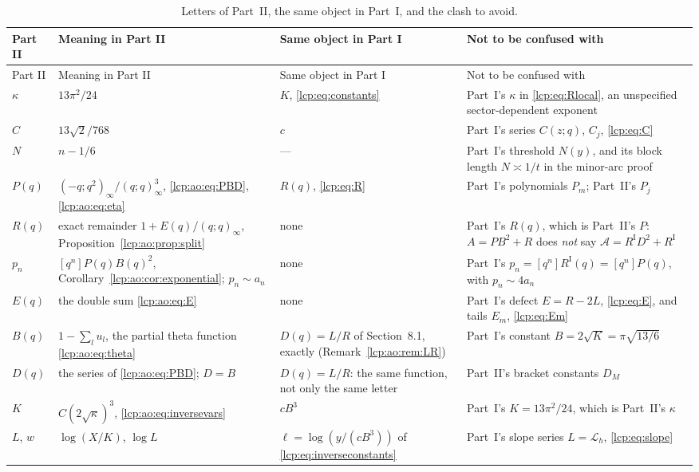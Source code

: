 \documentclass[11pt]{article}
\numberwithin{equation}{section}
\theoremstyle{definition}\newtheorem{definition}[theorem]{Definition}
\theoremstyle{remark}\newtheorem{remark}[theorem]{Remark}
\newcommand{\Acal}{\mathcal A}
\newcommand{\Lcal}{\mathcal L}
\begin{document}
{\small
\begin{longtable}{@{}>{\raggedright}p{}>{\raggedright}p{}>{\raggedright}p{}>{\raggedright\arraybackslash}p{}@{}}
\caption{Letters of Part~II, the same object in Part~I, and the clash to avoid.}\label{lcp:ao:tab:notation}\\
\toprule
Part II & Meaning in Part II & Same object in Part I & Not to be confused with\\
\midrule
\endfirsthead
\toprule
Part II & Meaning in Part II & Same object in Part I & Not to be confused with\\
\midrule
\endhead
\bottomrule
\endfoot
$\kappa$ & $13\pi^2/24$ & $K$, \eqref{lcp:eq:constants} & Part~I's $\kappa$ in \eqref{lcp:eq:Rlocal}, an unspecified sector-dependent exponent\\
$C$ & $13\sqrt2/768$ & $c$ & Part~I's series $C(z;q)$, $C_j$, \eqref{lcp:eq:C}\\
$N$ & $n-1/6$ & --- & Part~I's threshold $N(y)$, and its block length $N\asymp1/t$ in the minor-arc proof\\
$P(q)$ & $(-q;q^2)_\infty/(q;q)_\infty^3$, \eqref{lcp:ao:eq:PBD}, \eqref{lcp:ao:eq:eta} & $R(q)$, \eqref{lcp:eq:R} & Part~I's polynomials $P_m$; Part~II's $P_j$\\
$R(q)$ & exact remainder $1+E(q)/(q;q)_\infty$, Proposition~\ref{lcp:ao:prop:split} & none & Part~I's $R(q)$, which is Part~II's $P$: $A=PB^2+R$ does \emph{not} say $\Acal=R^{\mathrm I}D^2+R^{\mathrm I}$\\
$p_n$ & $[q^n]P(q)B(q)^2$, Corollary~\ref{lcp:ao:cor:exponential}; $p_n\sim a_n$ & none & Part~I's $p_n=[q^n]R^{\mathrm I}(q)=[q^n]P(q)$, with $p_n\sim4a_n$\\
$E(q)$ & the double sum \eqref{lcp:ao:eq:E} & none & Part~I's defect $E=R-2L$, \eqref{lcp:eq:E}, and tails $E_m$, \eqref{lcp:eq:Em}\\
$B(q)$ & $1-\sum_lu_l$, the partial theta function \eqref{lcp:ao:eq:theta} & $D(q)=L/R$ of Section~8.1, exactly (Remark~\ref{lcp:ao:rem:LR}) & Part~I's constant $B=2\sqrt K=\pi\sqrt{13/6}$\\
$D(q)$ & the series of \eqref{lcp:ao:eq:PBD}; $D=B$ & $D(q)=L/R$: the same function, not only the same letter & Part~II's bracket constants $D_M$\\
$K$ & $C(2\sqrt\kappa)^3$, \eqref{lcp:ao:eq:inversevars} & $cB^3$ & Part~I's $K=13\pi^2/24$, which is Part~II's $\kappa$\\
$L$, $w$ & $\log(X/K)$, $\log L$ & $\ell=\log(y/(cB^3))$ of \eqref{lcp:eq:inverseconstants} & Part~I's slope series $L=\Lcal_h$, \eqref{lcp:eq:slope}\\

\end{longtable}}
\end{document}
